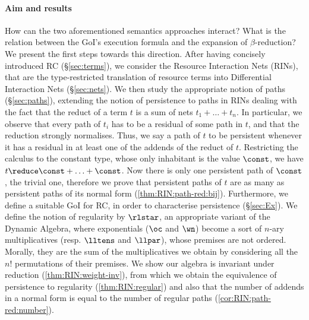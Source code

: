 \paragraph{Aim and results}
How can the two aforementioned semantics approaches interact?
What is the relation between the GoI's execution formula and the expansion of 
$\beta$-reduction?
We present the first steps towards this direction.
After having concisely introduced RC (§\ref{sec:terms}),
we consider the Resource Interaction Nets (RINs),
that are the type-restricted translation of 
resource terms into Differential Interaction Nets (§\ref{sec:nets}).
We then study the appropriate notion of paths (§\ref{sec:paths}), extending the 
notion of persistence to paths in RINs dealing with the fact that 
the reduct of a term $t$ is a sum of nets $t_1+\ldots+t_n$.
In particular, we observe that every path of $t_i$ has to be a residual of some 
path in $t$, and that the reduction strongly normalises.
Thus, we say a path of $t$ to be persistent whenever it has a residual in at 
least one of the addends of the reduct of $t$.
Restricting the calculus to the constant type, whose only inhabitant is the 
value $\const$, we have $t \reduce \const + \ldots + \const$.
Now there is only one persistent path of $\const$, the trivial one, therefore 
we prove that persistent paths of $t$ are as many as persistent paths of its 
normal form (\autoref{thm:RIN:path-red:bij}).
Furthermore, we define a suitable GoI for RC, in order to characterise 
persistence (§\ref{sec:Ex}).
We define the notion of regularity by $\rlstar$, an appropriate variant of 
the Dynamic Algebra, where exponentials ($\oc$ and $\wn$) become a sort of 
$n$-ary multiplicatives (resp. $\lltens$ and $\llpar$), whose premises are 
not ordered.
Morally, they are the sum of the multiplicatives we obtain by considering all 
the $n!$ permutations of their premises.
We show our algebra is invariant under reduction 
(\autoref{thm:RIN:weight-inv}), 
from which we obtain the equivalence of persistence to regularity
(\autoref{thm:RIN:regular}) and also that the number of addends in a normal 
form is 
equal to the number of regular paths (\autoref{cor:RIN:path-red:number}).

